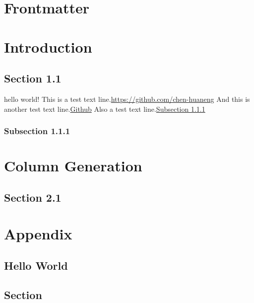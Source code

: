 \documentclass{note}
\begin{document}
\frontmatter

% 

\chapter{Frontmatter}
\lipsum[5-10]

\mainmatter

% 
% 
% 
% 
% 
% 

\chapter{Introduction}

\section{Section 1.1}

hello world!\cite{2015The} This is a test text line.\url{https://github.com/chen-huaneng} And this is another test text line.\href{https://github.com/chen-huaneng}{Github} Also a test text line.\hyperref[test]{Subsection 1.1.1}

\lipsum[5-10]

\subsection{Subsection 1.1.1}\label{test}

\lipsum[5-10]

\chapter{Column Generation}

\lipsum[5-10]

\section{Section 2.1}

\lipsum[5-10]

\backmatter

% 

\chapter*{Appendix}

\lipsum[5-10]

\section*{Hello World}

\lipsum[10-20]

\section{Section}

\lipsum[5-10]


\end{document}
